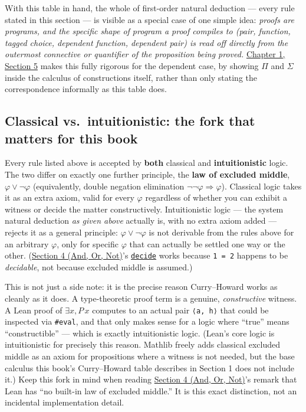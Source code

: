 With this table in hand, the whole of first-order natural deduction --- every rule stated in this section --- is visible as a special case of one simple idea: \emph{proofs are programs, and the specific shape of program a proof compiles to (pair, function, tagged choice, dependent function, dependent pair) is read off directly from the outermost connective or quantifier of the proposition being proved.} \hyperref[sec:01-basics:05-pi-sigma-and-coc:1]{Chapter 1, Section 5} makes this fully rigorous for the dependent case, by showing \(\Pi\) and \(\Sigma\) inside the calculus of constructions itself, rather than only stating the correspondence informally as this table does.

\subsection{Classical vs.~intuitionistic: the fork that matters for this book}\label{sec:03-propositions-and-proofs:02-logic-recap:7}

Every rule listed above is accepted by \textbf{both} classical and \textbf{intuitionistic} logic. The two differ on exactly one further principle, the \textbf{law of excluded middle}, \(\varphi \vee \neg\varphi\) (equivalently, double negation elimination \(\neg\neg\varphi \Rightarrow \varphi\)). Classical logic takes it as an extra axiom, valid for every \(\varphi\) regardless of whether you can exhibit a witness or decide the matter constructively. Intuitionistic logic --- the system natural deduction \emph{as given above} actually is, with no extra axiom added --- rejects it as a general principle: \(\varphi \vee \neg\varphi\) is not derivable from the rules above for an arbitrary \(\varphi\), only for specific \(\varphi\) that can actually be settled one way or the other. (\hyperref[sec:03-propositions-and-proofs:05-and-or-not:1]{Section 4 (And, Or, Not)}'s \href{https://lean-lang.org/doc/reference/latest/Tactic-Proofs/Tactic-Reference/}{\texttt{decide}} works because \texttt{1 = 2} happens to be \emph{decidable}, not because excluded middle is assumed.)

This is not just a side note: it is the precise reason Curry--Howard works as cleanly as it does. A type-theoretic proof term is a genuine, \emph{constructive} witness. A Lean proof of \(\exists x, P\, x\) computes to an actual pair \texttt{⟨a, h⟩} that could be inspected via \texttt{\#eval}, and that only makes sense for a logic where ``true'' means ``constructible'' --- which is exactly intuitionistic logic. (Lean's core logic is intuitionistic for precisely this reason. Mathlib freely adds classical excluded middle as an axiom for propositions where a witness is not needed, but the base calculus this book's Curry--Howard table describes in Section 1 does not include it.) Keep this fork in mind when reading \hyperref[sec:03-propositions-and-proofs:05-and-or-not:1]{Section 4 (And, Or, Not)}'s remark that Lean has ``no built-in law of excluded middle.'' It is this exact distinction, not an incidental implementation detail.

